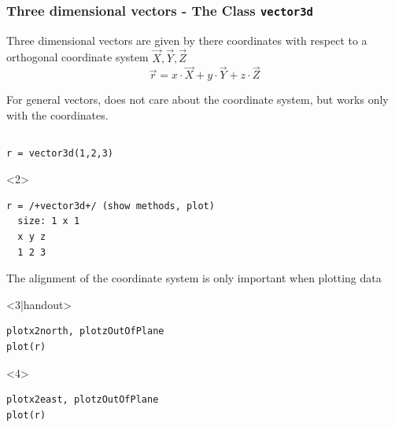 \documentclass[compress]{beamer}
\begin{document}
\begin{frame}[fragile]
  \frametitle{Three dimensional vectors - The \MTEX Class \texttt{\bf vector3d}}

  \begin{overlayarea}{\textwidth}{8cm}
  Three dimensional vectors are given by there coordinates with respect to a
  orthogonal coordinate system $\vec X, \vec Y, \vec Z$
  \begin{equation*}
    \vec r = x \cdot \vec X + y \cdot \vec Y + z \cdot \vec Z
  \end{equation*}

  \pause

  For general vectors, \MTEX does not care about the coordinate system, but
  works only with the coordinates.

  \begin{columns}
    \begin{column}{8cm}

      \begin{lstlisting}[style=input]
r = vector3d(1,2,3)
  \end{lstlisting}
      \begin{onlyenv}<2>
        \vspace{-0.3cm}
\begin{lstlisting}[style=output]
r = /+vector3d+/ (show methods, plot)
  size: 1 x 1
  x y z
  1 2 3
\end{lstlisting}
      \end{onlyenv}


      \pause
      \medskip

      The alignment of the coordinate system is only important when plotting
      data
      \begin{onlyenv}<3|handout>
\begin{lstlisting}[style=input]
plotx2north, plotzOutOfPlane
plot(r)
\end{lstlisting}
      \end{onlyenv}
      \begin{onlyenv}<4>
\begin{lstlisting}[style=input]
plotx2east, plotzOutOfPlane
plot(r)
\end{lstlisting}
      \end{onlyenv}


\end{column}
\end{columns}
\end{overlayarea}
\end{frame}
\end{document}
